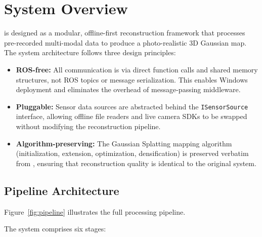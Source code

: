 \section{System Overview}
\label{sec:system_overview}

\winlic{} is designed as a modular, offline-first reconstruction framework
that processes pre-recorded multi-modal data to produce a photo-realistic
3D Gaussian map. The system architecture follows three design principles:

\begin{itemize}
    \item \textbf{ROS-free:} All communication is via direct function calls
    and shared memory structures, not ROS topics or message serialization.
    This enables Windows deployment and eliminates the overhead of
    message-passing middleware.

    \item \textbf{Pluggable:} Sensor data sources are abstracted behind the
    \texttt{ISensorSource} interface, allowing offline file readers and
    live camera SDKs to be swapped without modifying the reconstruction
    pipeline.

    \item \textbf{Algorithm-preserving:} The Gaussian Splatting mapping
    algorithm (initialization, extension, optimization, densification) is
    preserved verbatim from \gaussianlic, ensuring that reconstruction
    quality is identical to the original system.
\end{itemize}

\subsection{Pipeline Architecture}

Figure~\ref{fig:pipeline} illustrates the full processing pipeline.


The system comprises six stages:

